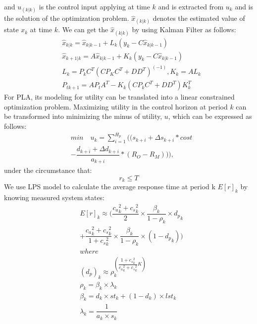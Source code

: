 \documentclass[sigconf]{acmart}
\begin{document}
and $u_(k|k)$ is the control input applying at time $k$ and is extracted from $u_k$ and is the solution of the optimization problem. $\hat{x}_(k|k)$ denotes the estimated value of state $x_k$ at time $k$. We can get the $\hat{x}_(k|k)$ by using Kalman Filter as follows:
\begin{equation}
	\begin{aligned}
		&\hat{x}_{k|k}=\hat{x}_{k|k-1}+L_k(y_k-C\hat{x}_{k|k-1})\\
		&\hat{x}_{k+1|k}=A\hat{x}_{k|k-1}+K_k(y_k-C\hat{x}_{k|k-1})\\
		&L_k=P_kC^T(CP_K C^T+DD^T)^(-1),K_k=AL_k\\
		&P_{tk+1}=AP_tA^T-K_k(CP_kC^T+DD^T)K_k^T
	\end{aligned}
\end{equation}
For PLA, its modeling for utility can be translated into a linear constrained optimization problem. Maximizing utility in the control horizon at period $k$ can be transformed into minimizing the minus of utility, $u$, which can be expressed as follows:
\begin{equation}
	\begin{aligned}
		&min\quad u_k=\sum_{i=1}^{H_p}((s_{k+i}+\Delta s_{k+i}*cost\\
		&-\dfrac{d_{k+i}+\Delta d_{k+i}}{a_{k+i}}*(R_{O}-R_{M}))), 
	\end{aligned}
\end{equation}
under the circumstance that:
\begin{equation}
	r_k\leq T 
\end{equation}
We use LPS model to calculate the average response time at period k $E[r]_k$ by knowing measured system states:
\begin{equation}
	\begin{aligned}
		&E[r]_k\approx( \dfrac{{c_a}_k^2+{c_s}_k^2}{2}\times \dfrac{\beta_k}{1-\rho_k}\times {d_p}_k\\
		&+\dfrac{{c_a}_k^2+{c_s}_k^2}{1+{c_s}_k^2}\times \dfrac{\beta_k}{1-\rho_k} \times (1-{d_p}_k)) \\
&where\\
&(d_p)_k\approx \rho_k^(\dfrac{1+{c_s}_k^2}{{c_a}_k^2+{c_s}_k^2}K)\\
&\rho_k=\beta_k \times \lambda_k\\
&\beta_k=d_k\times st_k+(1-d_k)\times lst_k\\
&\lambda_k=\dfrac{1}{a_k \times s_k}
\end{aligned}
\end{equation}	
\end{document}
